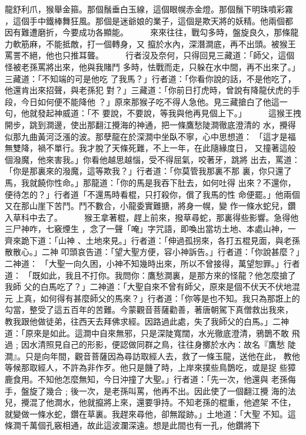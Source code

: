\begin{pinyinscope}
{龍舒利爪，猴舉金箍。那個鬚垂白玉線，這個眼幌赤金燈。那個鬚下明珠噴彩霧
，這個手中鐵棒舞狂風。那個是迷爺娘的業子，這個是欺天將的妖精。他兩個都
因有難遭磨折，今要成功各顯能。
　　
來來往往，戰勾多時，盤旋良久，那條龍力軟筋麻，不能抵敵，打一個轉身，又
攛於水內，深潛澗底，再不出頭。被猴王罵詈不絕，他也只推耳聾。
　　
行者沒及奈何，只得回見三藏道：「師父，這個怪被老孫罵將出來，他與我賭鬥
多時，怯戰而走，只躲在水中間，再不出來了。」三藏道：「不知端的可是他吃
了我馬？」行者道：「你看你說的話，不是他吃了，他還肯出來招聲，與老孫犯
對？」三藏道：「你前日打虎時，曾說有降龍伏虎的手段，今日如何便不能降他
？」原來那猴子吃不得人急他。見三藏搶白了他這一句，他就發起神威道：「不
要說，不要說，等我與他再見個上下。」
　　
這猴王拽開步，跳到澗邊，使出那翻江攪海的神通，把一條鷹愁陡澗徹底澄清的
水，攪得似那九曲黃河泛漲的波。那孽龍在於深澗中坐臥不寧，心中思想道：
「這才是福無雙降，禍不單行。我才脫了天條死難，不上一年，在此隨緣度日，
又撞著這般個潑魔，他來害我。」你看他越思越惱，受不得屈氣，咬著牙，跳將
出去，罵道：「你是那裏來的潑魔，這等欺我？」行者道：「你莫管我那裏不那
裏，你只還了馬，我就饒你性命。」那龍道：「你的馬是我吞下肚去，如何吐得
出來？不還你，便待怎的？」行者道「不還馬時看棍，只打殺你，償了我馬的性
命便罷。」他兩個又在那山崖下苦鬥。鬥不數合，小龍委實難搪，將身一幌，變
作一條水蛇兒，鑽入草科中去了。
　　
猴王拿著棍，趕上前來，撥草尋蛇，那裏得些影響。急得他三尸神咋，七竅煙生
，念了一聲「唵」字咒語，即喚出當坊土地、本處山神，一齊來跪下道：「山神
、土地來見。」行者道：「伸過孤拐來，各打五棍見面，與老孫散散心。」二神
叩頭哀告道：「望大聖方便，容小神訴告。」行者道：「你說甚麼？」二神道：
「大聖一向久困，小神不知幾時出來，所以不曾接得，萬望恕罪。」行者道：
「既如此，我且不打你。我問你：鷹愁澗裏，是那方來的怪龍？他怎麼搶了我師
父的白馬吃了？」二神道：「大聖自來不曾有師父，原來是個不伏天不伏地混元
上真，如何得有甚麼師父的馬來？」行者道：「你等是也不知。我只為那誑上的
勾當，整受了這五百年的苦難。今蒙觀音菩薩勸善，著唐朝駕下真僧救出我來，
教我跟他做徒弟，往西天去拜佛求經。因路過此處，失了我師父的白馬。」二神
道：「原來是如此。這澗中自來無邪，只是深陡寬闊，水光徹底澄清，鴉鵲不敢
飛過﹔因水清照見自己的形影，便認做同群之鳥，往往身擲於水內：故名『鷹愁
陡澗』。只是向年間，觀音菩薩因為尋訪取經人去，救了一條玉龍，送他在此，
教他等候那取經人，不許為非作歹。他只是饑了時，上岸來撲些鳥鵲吃，或是捉
些獐鹿食用。不知他怎麼無知，今日沖撞了大聖。」行者道：「先一次，他還與
老孫侮手，盤旋了幾合﹔後一次，是老孫叫罵，他再不出。因此使了一個翻江攪
海的法兒，攪混了他澗水，他就攛將上來，還要爭持。不知老孫的棍重，他遮架
不住，就變做一條水蛇，鑽在草裏。我趕來尋他，卻無蹤跡。」土地道：「大聖
不知。這條澗千萬個孔竅相通，故此這波瀾深遠。想是此間也有一孔，他鑽將下
}
\end{pinyinscope}

